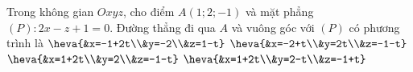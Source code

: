 \begin{vd}[TN2024-102]%
    Trong không gian $Oxyz$, cho điểm $A(1;2;-1)$ và mặt phẳng $(P)\colon 2x-z+1=0$. Đường thẳng đi qua $A$ và vuông góc với $(P)$ có phương trình là
    \choice
    {$\heva{&x=-1+2t\\&y=-2\\&z=1-t}$}
    {$\heva{&x=-2+t\\&y=2t\\&z=-1-t}$}
    {\True $\heva{&x=1+2t\\&y=2\\&z=-1-t}$}
    {$\heva{&x=1+2t\\&y=2-t\\&z=-1+t}$}
\end{vd}

